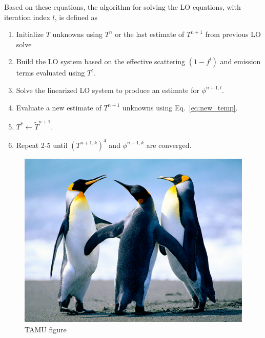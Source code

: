 Based on these equations, the algorithm for solving the LO equations, with iteration index
$l$, is defined as
\begin{enumerate}
    \item Initialize $T$ unknowns using $T^n$ or the last estimate of $T^{n+1}$ from
        previous LO solve
    \item  Build the LO system based on the effective scattering $(1-f^l)$ and emission terms
          evaluated using $T^l$.
    \item Solve the linearized LO system to produce an estimate for $\phi^{n+1,l}$.
    \item Evaluate a new estimate of $T^{n+1}$ unknowns using Eq.~\eqref{eq:new_temp}.
    \item $T^*\leftarrow\tilde{T}^{n+1}$.
    \item Repeat 2-5 until $(T^{n+1,k})^4$ and $\phi^{n+1,k}$ are converged.
\end{enumerate}

\begin{figure}[H]
\centering
\includegraphics[scale=.50]{figures/Penguins.jpg}
\caption{TAMU figure}
\label{fig:tamu-fig5}
\end{figure}
